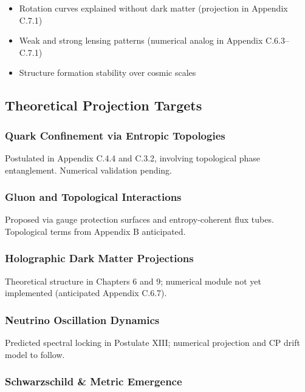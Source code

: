 \documentclass[10.5pt,a4paper]{article}
\begin{document}
\begin{itemize}
  \item Rotation curves explained without dark matter (projection in Appendix C.7.1)
  \item Weak and strong lensing patterns (numerical analog in Appendix C.6.3--C.7.1)
  \item Structure formation stability over cosmic scales
\end{itemize}

\subsection{Theoretical Projection Targets}

\subsubsection{Quark Confinement via Entropic Topologies}

Postulated in Appendix C.4.4 and C.3.2, involving topological phase entanglement. Numerical validation pending.

\subsubsection{Gluon and Topological Interactions}

Proposed via gauge protection surfaces and entropy-coherent flux tubes. Topological terms from Appendix B anticipated.

\subsubsection{Holographic Dark Matter Projections}

Theoretical structure in Chapters 6 and 9; numerical module not yet implemented (anticipated Appendix C.6.7).

\subsubsection{Neutrino Oscillation Dynamics}

Predicted spectral locking in Postulate XIII; numerical projection and CP drift model to follow.

\subsubsection{Schwarzschild \& Metric Emergence}
\end{document}
